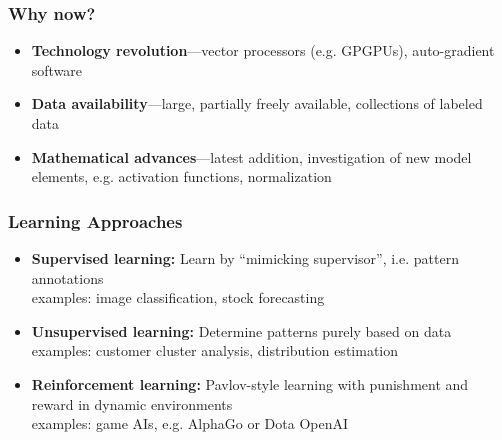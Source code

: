 \documentclass[aspectratio=169]{beamer}
\begin{document}
\begin{frame}
\frametitle{Why now?}
    \begin{itemize}
        \item \textbf{Technology revolution}---vector processors (e.g. GPGPUs), auto-gradient software
        \item \textbf{Data availability}---large, partially freely available, collections of labeled data
        \item \textbf{Mathematical advances}---latest addition, investigation of new model elements, e.g. activation functions, normalization
    \end{itemize}
\end{frame}

\begin{frame}
\frametitle{Learning Approaches}
    \begin{itemize}
        \item \textbf{Supervised learning:} Learn by ``mimicking supervisor'', i.e. pattern annotations\\ 
        examples: image classification, stock forecasting
        \item \textbf{Unsupervised learning:} Determine patterns purely based on data\\ examples: customer cluster analysis, distribution estimation
        \item \textbf{Reinforcement learning:} Pavlov-style learning with punishment and reward in dynamic environments\\
        examples: game AIs, e.g. AlphaGo or Dota OpenAI
    \end{itemize}
\end{frame}
\end{document}
